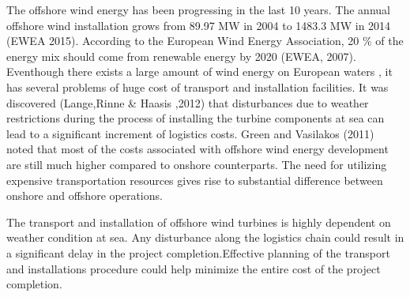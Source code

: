 \begin{introduction}

The offshore wind energy has been progressing in the last 10 years. The annual offshore wind installation grows from 89.97 MW in 2004 to 1483.3 MW in 2014 (EWEA 2015). According to the European Wind Energy Association, 20 \% of the energy mix should come from renewable energy by 2020 (EWEA, 2007). Eventhough there exists a large amount of wind energy on European waters , it has several problems of huge cost of transport and installation facilities. It was discovered (Lange,Rinne & Haasis ,2012) that disturbances due to weather restrictions during the process of installing the turbine components at sea can lead to a significant increment of logistics costs. Green and Vasilakos (2011) noted that most of the costs associated with offshore wind energy development are still much higher compared to onshore counterparts. The need for utilizing expensive transportation resources gives rise to substantial difference between onshore and offshore operations. 

The transport and installation of offshore wind turbines is highly dependent on weather condition at sea. Any disturbance along the logistics chain could result in a significant delay in the project completion.Effective planning of the transport and installations procedure could help minimize the entire cost of the project completion. 

\end{introduction}
